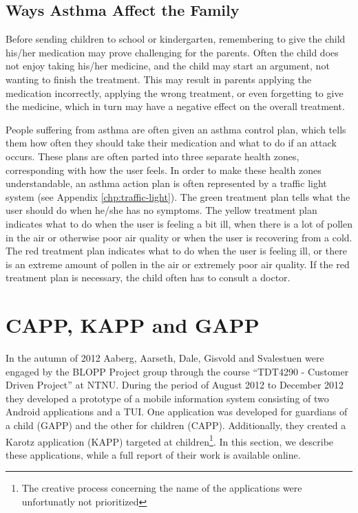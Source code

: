 \subsection{Ways Asthma Affect the Family}
\label{sec:waysasthmaaffectthefamily}
Before sending children to school or kindergarten, remembering to give the child his/her medication may prove challenging for the parents. Often the child does not enjoy taking his/her medicine, and the child may start an argument, not wanting to finish the treatment. This may result in parents applying the medication incorrectly, applying the wrong treatment, or even forgetting to give the medicine, which in turn may have a negative effect on the overall treatment.  


People suffering from asthma are often given an asthma control plan, which tells them how often they should take their medication and what to do if an attack occurs. These plans are often parted into three separate health zones, corresponding with how the user feels. In order to make these health zones understandable, an asthma action plan is often represented by a traffic light system (see Appendix \ref{chp:traffic-light}). The green treatment plan tells what the user should do when he/she has no symptoms. The yellow treatment plan indicates what to do when the user is feeling a bit ill, when there is a lot of pollen in the air or otherwise poor air quality or when the user is recovering from a cold. The red treatment plan indicates what to do when the user is feeling ill, or there is an extreme amount of pollen in the air or extremely poor air quality. If the red treatment plan is necessary, the child often has to consult a doctor. 


\section{CAPP, KAPP and GAPP}
\label{sec:cappgappkapp}
In the autumn of 2012 Aaberg, Aarseth, Dale, Gisvold and Svalestuen were engaged by the BLOPP Project group through the course ``TDT4290 - Customer Driven Project'' at NTNU. During the period of August 2012 to December 2012 they developed a prototype of a mobile information system consisting of two Android applications and a TUI. One application was developed for guardians of a child (GAPP) and the other for children (CAPP). Additionally, they created a Karotz application (KAPP) targeted at children\footnote{The creative process concerning the name of the applications were unfortunatly not prioritized}. In this section, we describe these applications, while a full report of their work is available online\cite{CustomerDriven}. 

